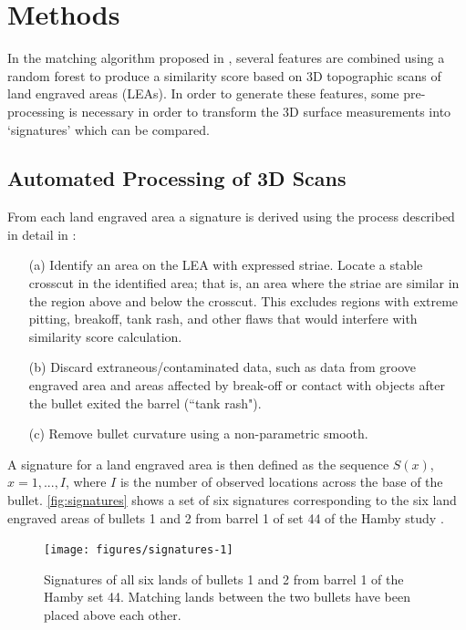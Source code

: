 \documentclass[doubleblind]{elsarticle}\usepackage[]{graphicx}\usepackage[]{color}
\newenvironment{knitrout}{}{} %
\begin{document}
\section{Methods}

In the matching algorithm proposed in \citet{aoas2}, several features are combined using a random forest \citep{breiman} to produce a similarity score based on 3D topographic scans of land engraved areas (LEAs). In order to generate these features, some pre-processing is necessary in order to transform the 3D surface measurements into `signatures' which can be compared.

\subsection{Automated Processing of 3D Scans}

From each land engraved area a signature is derived using the process described in detail in \citet{aoas2}:

\begin{itemize}
\item[(a)] Identify an area on the LEA with expressed striae. Locate a stable crosscut in the identified area; that is, an area where the striae are similar in the region above and below the crosscut. This excludes regions with extreme pitting, breakoff, tank rash, and other flaws that would interfere with similarity score calculation.
\item[(b)] Discard extraneous/contaminated data, such as data from groove engraved area and areas affected by break-off or contact with objects after the bullet exited the barrel  (``tank rash").
\item[(c)] Remove bullet curvature using a non-parametric smooth. 
\end{itemize}
A signature for a land engraved area is then defined as the sequence $S(x)$, $x = 1, ..., I$, where $I$ is the number of observed locations across the base of the bullet. \autoref{fig:signatures} shows a set of six signatures corresponding to the six land engraved areas of bullets 1 and 2 from barrel 1 of set 44 of the Hamby study \citep{hamby}. 
\begin{knitrout}
\color{fgcolor}\begin{figure}

{\centering \texttt{[image: figures/signatures-1]} 

}

\caption[Signatures of all six lands of bullets 1 and 2 from barrel 1 of the Hamby set 44]{Signatures of all six lands of bullets 1 and 2 from barrel 1 of the Hamby set 44. Matching lands between the two bullets have been placed above each other.}\label{fig:signatures}
\end{figure}


\end{knitrout}
\end{document}
